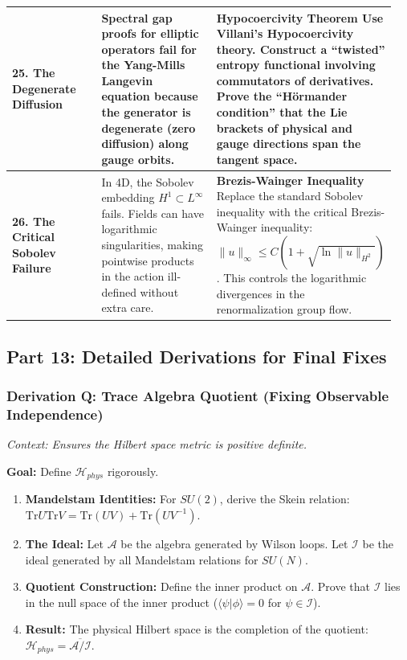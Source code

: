 \begin{center}
\begin{tabular}{|p{0.25\linewidth}|p{0.35\linewidth}|p{0.35\linewidth}|}
\hline
\textbf{25. The Degenerate Diffusion} & Spectral gap proofs for elliptic operators fail for the Yang-Mills Langevin equation because the generator is degenerate (zero diffusion) along gauge orbits. & \textbf{Hypocoercivity Theorem} \newline Use Villani’s Hypocoercivity theory. Construct a ``twisted'' entropy functional involving commutators of derivatives. Prove the ``Hörmander condition'' that the Lie brackets of physical and gauge directions span the tangent space. \\
\hline
\textbf{26. The Critical Sobolev Failure} & In 4D, the Sobolev embedding $H^1 \subset L^{\infty}$ fails. Fields can have logarithmic singularities, making pointwise products in the action ill-defined without extra care. & \textbf{Brezis-Wainger Inequality} \newline Replace the standard Sobolev inequality with the critical Brezis-Wainger inequality: $\|u\|_{\infty} \le C(1 + \sqrt{\ln \|u\|_{H^2}})$. This controls the logarithmic divergences in the renormalization group flow. \\
\hline
\end{tabular}
\end{center}

\subsection{Part 13: Detailed Derivations for Final Fixes}

\subsubsection{Derivation Q: Trace Algebra Quotient (Fixing Observable Independence)}

\textit{Context: Ensures the Hilbert space metric is positive definite.}

\textbf{Goal:} Define $\mathcal{H}_{phys}$ rigorously.

\begin{enumerate}
    \item \textbf{Mandelstam Identities:} For $SU(2)$, derive the Skein relation: $\text{Tr}U \text{Tr}V = \text{Tr}(UV) + \text{Tr}(UV^{-1})$.
    \item \textbf{The Ideal:} Let $\mathcal{A}$ be the algebra generated by Wilson loops. Let $\mathcal{I}$ be the ideal generated by all Mandelstam relations for $SU(N)$.
    \item \textbf{Quotient Construction:} Define the inner product on $\mathcal{A}$. Prove that $\mathcal{I}$ lies in the null space of the inner product ($\langle \psi | \phi \rangle = 0$ for $\psi \in \mathcal{I}$).
    \item \textbf{Result:} The physical Hilbert space is the completion of the quotient: $\mathcal{H}_{phys} = \overline{\mathcal{A} / \mathcal{I}}$.
\end{enumerate}

